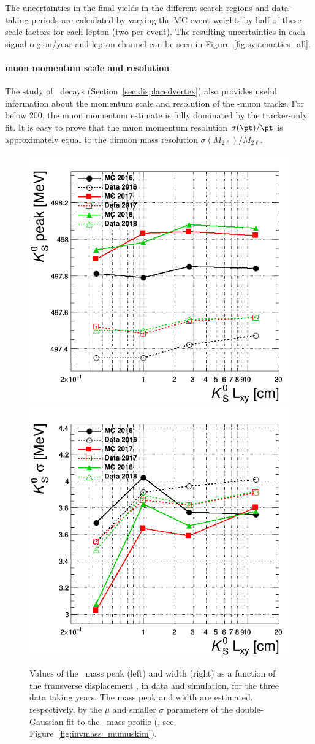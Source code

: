 The uncertainties in the final yields in the different search regions
and data-taking periods are calculated by varying the MC event weights
by half of these scale factors for each \displ lepton (\ie two per
event). The resulting uncertainties in each signal region/year and
lepton channel can be seen in Figure~\ref{fig:systematics_all}.  

\paragraph{\Displ muon momentum scale and resolution}
\label{sec:nonpromptleptonscaleresol}
The study of \PKzS\ decays (Section~\ref{sec:displacedvertex}) also
provides useful information about the momentum scale and resolution of
the \displ-muon tracks. For \pt below 200\GeV, the muon momentum 
estimate is fully dominated by the tracker-only fit. It is easy to
prove that the muon momentum resolution $\sigma(\pt)/\pt$ is
approximately equal to the dimuon mass resolution
$\sigma(M_{2\ell})/M_{2\ell}$.
\begin{figure}[h!]
  \centering
  \includegraphics[width=.40\textwidth]{Figures/c6/systematics/scale_displMu.png}
  \includegraphics[width=.40\textwidth]{Figures/c6/systematics/resolution_displMu.png}
  \caption{Values of the \PKzS\ mass peak (left) and width (right) as
    a function of the transverse displacement \Deltwod, in data and
    simulation, for the three data taking years. The mass peak and
    width are estimated, respectively, by the $\mu$ and smaller
    $\sigma$ parameters of the double-Gaussian fit to the
    \PKzS\ mass profile (\eg, see Figure~\ref{fig:invmass_mumuskim}). \dani}
  \label{fig:displMuScaleResol}
\end{figure}
